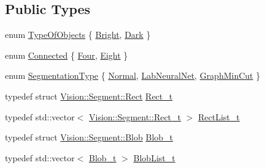 \subsection*{Public Types}
\begin{DoxyCompactItemize}
\item 
enum \hyperlink{class_vision_1_1_segment_ac3ddf2c72ee6333007510b680db1e7dd}{Type\+Of\+Objects} \{ \hyperlink{class_vision_1_1_segment_ac3ddf2c72ee6333007510b680db1e7ddad37a09a08a5a4fdf88cb15f21e5ff28b}{Bright}, 
\hyperlink{class_vision_1_1_segment_ac3ddf2c72ee6333007510b680db1e7dda962a0c0955809f63df036dbd41824c54}{Dark}
 \}
\item 
enum \hyperlink{class_vision_1_1_segment_a330240c08320e72270fac0aa83d5e27e}{Connected} \{ \hyperlink{class_vision_1_1_segment_a330240c08320e72270fac0aa83d5e27ea1fca5ab1c285c0edd2bdc3072cab0c01}{Four}, 
\hyperlink{class_vision_1_1_segment_a330240c08320e72270fac0aa83d5e27eae8e2b0fa6d15448f10cddc0390284a39}{Eight}
 \}
\item 
enum \hyperlink{class_vision_1_1_segment_af3a2b992526eac54bca53e34cf2db4da}{Segmentation\+Type} \{ \hyperlink{class_vision_1_1_segment_af3a2b992526eac54bca53e34cf2db4daae000cfc8d629752d6cdbba0d3d750184}{Normal}, 
\hyperlink{class_vision_1_1_segment_af3a2b992526eac54bca53e34cf2db4daa6ddef558061ee58899a362608a5b163b}{Lab\+Neural\+Net}, 
\hyperlink{class_vision_1_1_segment_af3a2b992526eac54bca53e34cf2db4daa0291c0ff93e52e8e78f86698b0288353}{Graph\+Min\+Cut}
 \}
\item 
typedef struct \hyperlink{struct_vision_1_1_segment_1_1_rect}{Vision\+::\+Segment\+::\+Rect} \hyperlink{class_vision_1_1_segment_af9428422a82edaab8a1e5ba59acc8c16}{Rect\+\_\+t}
\item 
typedef std\+::vector$<$ \hyperlink{class_vision_1_1_segment_af9428422a82edaab8a1e5ba59acc8c16}{Vision\+::\+Segment\+::\+Rect\+\_\+t} $>$ \hyperlink{class_vision_1_1_segment_aaaa7a3b37f6fa4402bc1309e9bf74bec}{Rect\+List\+\_\+t}
\item 
typedef struct \hyperlink{struct_vision_1_1_segment_1_1_blob}{Vision\+::\+Segment\+::\+Blob} \hyperlink{class_vision_1_1_segment_add6c81230e499b159218c5232e3b76ae}{Blob\+\_\+t}
\item 
typedef std\+::vector$<$ \hyperlink{class_vision_1_1_segment_add6c81230e499b159218c5232e3b76ae}{Blob\+\_\+t} $>$ \hyperlink{class_vision_1_1_segment_a60e08251e2ab94239e245044c31cde51}{Blob\+List\+\_\+t}
\end{DoxyCompactItemize}
